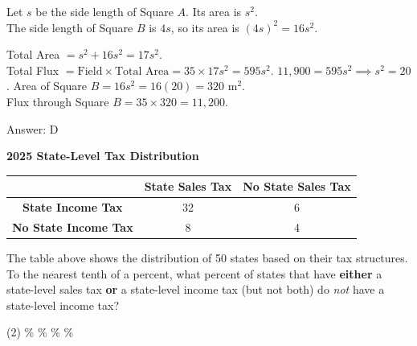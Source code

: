 \documentclass[11pt,paper=a4,answers]{exam}
\begin{document}
\begin{questions}
\begin{solution}
Let $s$ be the side length of Square $A$. Its area is $s^2$. \\
The side length of Square $B$ is $4s$, so its area is $(4s)^2 = 16s^2$.
\vspace{5pt}
\begin{center}
Total Area $= s^2 + 16s^2 = 17s^2$. \\
Total Flux $= \text{Field} \times \text{Total Area} = 35 \times 17s^2 = 595s^2$.
\vspace{5pt}
$11,900 = 595s^2 \implies s^2 = 20$.
\vspace{5pt}
Area of Square $B = 16s^2 = 16(20) = 320 \text{ m}^2$. \\
Flux through Square $B = 35 \times 320 = 11,200$.
\end{center}
\vspace{5pt}
Answer: \colorbox{yellow!100}{D}
\end{solution}

\vspace{1cm}

\question
\begin{center}
\textbf{2025 State-Level Tax Distribution} \\
\vspace{5pt}
\begin{tabular}{|c|c|c|}
\hline
 & \textbf{State Sales Tax} & \textbf{No State Sales Tax} \\ \hline
\textbf{State Income Tax} & 32 & 6 \\ \hline
\textbf{No State Income Tax} & 8 & 4 \\ \hline
\end{tabular}
\end{center}
The table above shows the distribution of 50 states based on their tax structures. To the nearest tenth of a percent, what percent of states that have \textbf{either} a state-level sales tax \textbf{or} a state-level income tax (but not both) do \textit{not} have a state-level income tax?
\begin{tasks}(2)
    \%
    \%
    \%
    \%
\end{tasks}


\end{questions}
\end{document}
